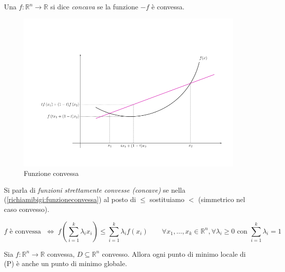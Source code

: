 \begin{defn}
 Una $f: \mathbb{R}^n \rightarrow \mathbb{R}$ si dice \emph{concava} 
 se la funzione $-f$ è convessa.
\end{defn}
\begin{figure}[!h]
  \centerline{\includegraphics[scale=0.6]{imgs/img03.png}}
  \label{fig:theFi2}
  \caption{Funzione convessa}
\end{figure}

Si parla di \emph{funzioni strettamente convesse (concave)} se 
nella (\ref{richiamibigi:funzioneconvessa}) al posto
 di $\leq$ sostituiamo $<$ (simmetrico nel caso convesso).

 \begin{observation}
  $$ f \text{ \`e convessa } \; \Longleftrightarrow \;
f\left(\displaystyle \sum_{i=1}^{k} \lambda_i x_i \right) \leq 
\displaystyle \sum_{i=1}^{k} \lambda_i f(x_i)
\qquad
\forall x_1, \ldots, x_k \in \mathbb{R}^{n}, \forall \lambda_i \geq 0
\text{ con }  \displaystyle \sum_{i=1}^{k} \lambda_i = 1
$$
 \end{observation}

\begin{theo}
 Sia $f: \mathbb{R}^n \rightarrow \mathbb{R}$ convessa,
 $D \subseteq \mathbb{R}^n$ convesso. Allora ogni punto di minimo
 locale di (P) \`e anche un punto di minimo globale.
\end{theo}

